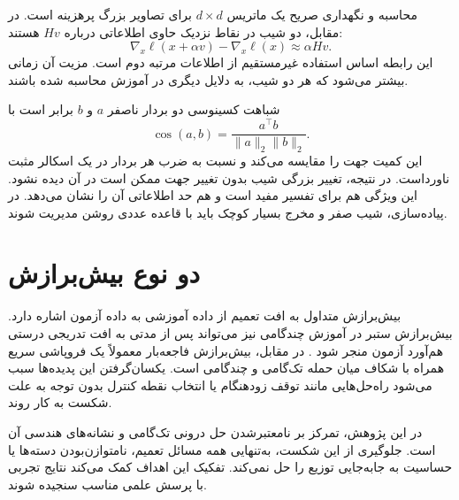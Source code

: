 محاسبه و نگهداری صریح یک ماتریس $d\times d$ برای تصاویر بزرگ پرهزینه است. در مقابل، دو شیب در نقاط نزدیک حاوی اطلاعاتی درباره $Hv$ هستند:
\begin{equation}\label{eq:gradient-difference}
\nabla_x\ell(x+\alpha v)-\nabla_x\ell(x)\approx\alpha Hv.
\end{equation}
این رابطه اساس استفاده غیرمستقیم از اطلاعات مرتبه دوم است. مزیت آن زمانی بیشتر می‌شود که هر دو شیب، به دلایل دیگری در آموزش محاسبه شده باشند.

شباهت کسینوسی دو بردار ناصفر $a$ و $b$ برابر است با
\begin{equation}
\cos(a,b)=\frac{a^\top b}{\|a\|_2\|b\|_2}.
\end{equation}
این کمیت جهت را مقایسه می‌کند و نسبت به ضرب هر بردار در یک اسکالر مثبت ناورداست. در نتیجه، تغییر بزرگی شیب بدون تغییر جهت ممکن است در آن دیده نشود. این ویژگی هم برای تفسیر \pertalign{} مفید است و هم حد اطلاعاتی آن را نشان می‌دهد. در پیاده‌سازی، شیب صفر و مخرج بسیار کوچک باید با قاعده عددی روشن مدیریت شوند.

\section{دو نوع بیش‌برازش}
بیش‌برازش متداول به افت تعمیم از داده آموزشی به داده آزمون اشاره دارد. بیش‌برازش ستبر در آموزش چندگامی نیز می‌تواند پس از مدتی به افت تدریجی درستی هم‌آورد آزمون منجر شود \cite{rice2020overfitting}. در مقابل، بیش‌برازش فاجعه‌بار معمولاً یک فروپاشی سریع همراه با شکاف میان حمله تک‌گامی و چندگامی است. یکسان‌گرفتن این پدیده‌ها سبب می‌شود راه‌حل‌هایی مانند توقف زودهنگام یا انتخاب نقطه کنترل بدون توجه به علت شکست به کار روند.

در این پژوهش، تمرکز بر نامعتبرشدن حل درونی تک‌گامی و نشانه‌های هندسی آن است. جلوگیری از این شکست، به‌تنهایی همه مسائل تعمیم، نامتوازن‌بودن دسته‌ها یا حساسیت به جابه‌جایی توزیع را حل نمی‌کند. تفکیک این اهداف کمک می‌کند نتایج تجربی با پرسش علمی مناسب سنجیده شوند.
